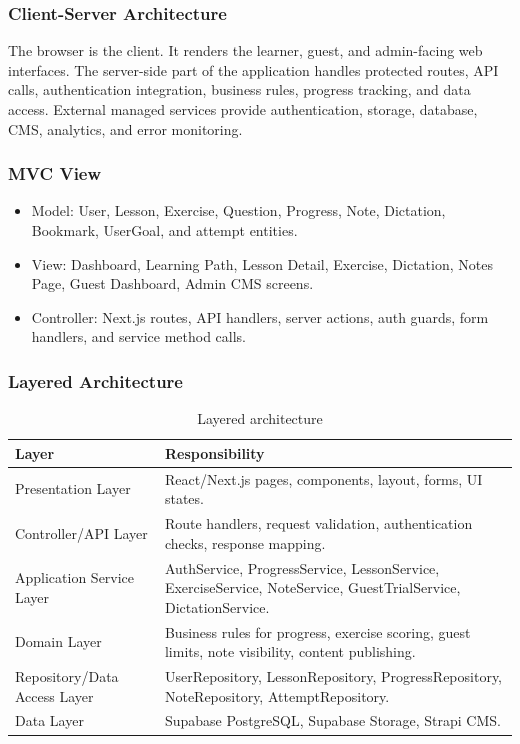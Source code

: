 
\subsubsection{Client-Server Architecture}

The browser is the client. It renders the learner, guest, and admin-facing web interfaces. The server-side part of the application handles protected routes, API calls, authentication integration, business rules, progress tracking, and data access. External managed services provide authentication, storage, database, CMS, analytics, and error monitoring.

\subsubsection{MVC View}

\begin{itemize}[leftmargin=*]
  \item Model: User, Lesson, Exercise, Question, Progress, Note, Dictation, Bookmark, UserGoal, and attempt entities.
  \item View: Dashboard, Learning Path, Lesson Detail, Exercise, Dictation, Notes Page, Guest Dashboard, Admin CMS screens.
  \item Controller: Next.js routes, API handlers, server actions, auth guards, form handlers, and service method calls.
\end{itemize}

\subsubsection{Layered Architecture}

\begin{table}[H]
\centering
\begin{tabularx}{\linewidth}{X X}
\toprule
Layer & Responsibility \\
\midrule
Presentation Layer & React/Next.js pages, components, layout, forms, UI states. \\
Controller/API Layer & Route handlers, request validation, authentication checks, response mapping. \\
Application Service Layer & AuthService, ProgressService, LessonService, ExerciseService, NoteService, GuestTrialService, DictationService. \\
Domain Layer & Business rules for progress, exercise scoring, guest limits, note visibility, content publishing. \\
Repository/Data Access Layer & UserRepository, LessonRepository, ProgressRepository, NoteRepository, AttemptRepository. \\
Data Layer & Supabase PostgreSQL, Supabase Storage, Strapi CMS. \\
\bottomrule
\end{tabularx}
\caption{Layered architecture}
\end{table}

